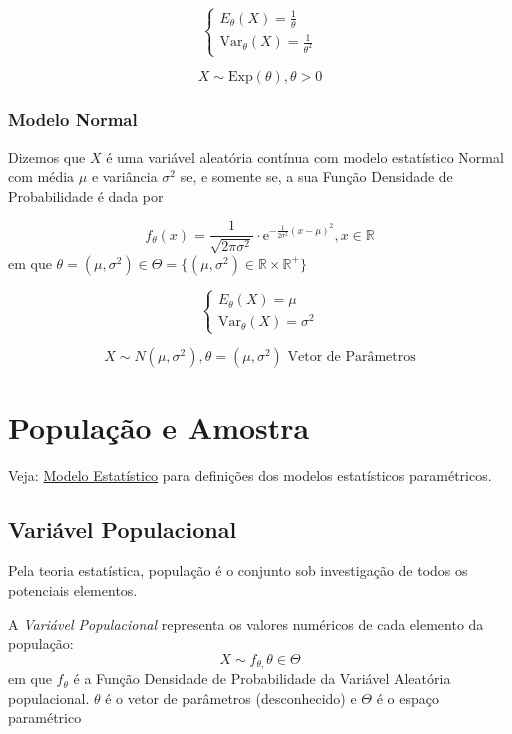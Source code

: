 \documentclass[
  letterpaper,
  DIV=11,
  numbers=noendperiod]{scrreprt}
\begin{document}
\[
\begin{cases}
E_\theta(X)=\frac{1}{\theta}\\
\mathrm{Var}_\theta(X) = \frac{1}{\theta^{2}}
\end{cases}
\]

\[
X\sim \mathrm{Exp}(\theta), \theta> 0
\]

\subsection{Modelo Normal}\label{modelo-normal}

Dizemos que \(X\) é uma variável aleatória contínua com modelo
estatístico Normal com média \(\mu\) e variância \(\sigma^{2}\) se, e
somente se, a sua Função Densidade de Probabilidade é dada por

\[
f_\theta(x)=
\frac{1}{\sqrt{2\pi \sigma^{2}}}\cdot \mathrm{e}^{-\frac{1}{2\sigma^{2}}(x-\mu)^{2}}, x \in \mathbb{R}
\] em que
\(\theta= (\mu, \sigma^{2}) \in \Theta=\{(\mu, \sigma^{2}) \in \mathbb{R}\times \mathbb{R}^{+}\}\)

\[
\begin{cases}
E_\theta(X)=\mu\\
\mathrm{Var}_\theta(X) = \sigma^{2}
\end{cases}
\]

\[
X \sim N (\mu, \sigma^{2}), \theta=(\mu, \sigma^{2}) \text{ Vetor de Parâmetros}
\]


\chapter{População e Amostra}\label{populauxe7uxe3o-e-amostra}

Veja: \href{modelo-estatistico.qmd}{Modelo Estatístico} para definições
dos modelos estatísticos paramétricos.

\section{Variável Populacional}\label{sec-vp}

Pela teoria estatística, população é o conjunto sob investigação de
todos os potenciais elementos.

A \emph{Variável Populacional} representa os valores numéricos de cada
elemento da população: \[
X\sim f_{\theta,}\theta \in \Theta
\] em que \(f_\theta\) é a Função Densidade de Probabilidade da Variável
Aleatória populacional. \(\theta\) é o vetor de parâmetros
(desconhecido) e \(\Theta\) é o espaço paramétrico
\end{document}
